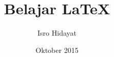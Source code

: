 \documentclass[11pt,a4paper,oneside]{report}
\begin{document}
\title{\color{red}Belajar LaTeX}
\author{\color{blue}Isro Hidayat}
\date{\color{green}Oktober 2015}
\maketitle
\end{document}
